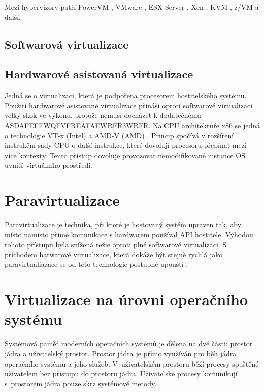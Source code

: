 Mezi hypervizory patří PowerVM , VMware \cite{vmware}, ESX Server \cite{esx_server}, Xen \cite{xen}, KVM \cite{kvm}, z/VM \cite{z_vm} a další.

\subsection{Softwarová virtualizace}

\subsection{Hardwarové asistovaná virtualizace}

Jedná se o virtualizaci, která je podpořena procesorem hostitelského systému.
Použití hardwarově asistované virtualizace přináší oproti softwarové virtualizaci velký skok ve výkonu, protože nemusí docházet k dodatečnému ASDAFEFEWQFVFREAFAEWRFR3WRFR.
Na CPU architektuře x86 se jedná o technologie VT-x (Intel) \cite{vt_x} a AMD-V (AMD) \cite{amd_v}.
Princip spočívá v rozšíření instrukční sady CPU o další instrukce, které dovolují procesoru přepínat mezi více kontexty.
Tento přístup dovoluje provozovat nemodifikované instance OS uvnitř virtuálního prostředí.

\section{Paravirtualizace}

Paravirtualizace je technika, při které je hostovaný systém upraven tak, aby místo namísto přímé komunikace s hardwarem používal API hostitele.
Výhodou tohoto přístupu byla snížená režie oproti plné softwarové virtualizaci.
S příchodem harwarové virtualizace, která dokáže být stejně rychlá jako paravirtualiazace se od této technologie postupně upouští \cite{paravirtualization_leave}.


\section{Virtualizace na úrovni operačního systému}

Systémová paměť moderních operačních systémů je dělena na dvě části: prostor jádra a uživatelský prostor.
Prostor jádra je přímo využíván pro běh jádra operačního systému a jeho služeb.
V~uživatelském prostoru běží procesy spuštěné uživatelem bez přístupu do prostoru jádra.
Uživatelské procesy komunikují s~prostorem jádra pouze skrz systémové metody.
\cite{kernel_space}

